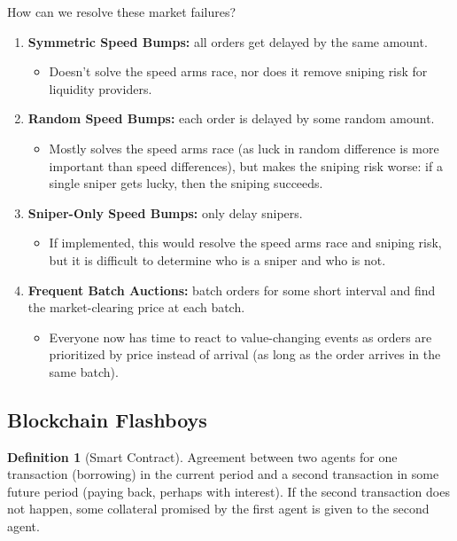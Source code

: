 \documentclass[dvipsnames]{article}
\theoremstyle{definition}
\newtheorem{definition}{Definition}[section]
\theoremstyle{remark}
\begin{document}
How can we resolve these market failures? 

\begin{enumerate}
	\item \textbf{Symmetric Speed Bumps:} all orders get delayed by the same amount. 
	\begin{itemize}
		\item Doesn't solve the speed arms race, nor does it remove sniping risk for liquidity providers.
	\end{itemize}
	\item \textbf{Random Speed Bumps:} each order is delayed by some random amount.
	\begin{itemize}
		\item Mostly solves the speed arms race (as luck in random difference is more important than speed differences), but makes the sniping risk worse: if a single sniper gets lucky, then the sniping succeeds.
	\end{itemize}
	\item \textbf{Sniper-Only Speed Bumps:} only delay snipers.
	\begin{itemize}
		\item If implemented, this would resolve the speed arms race and sniping risk, but it is difficult to determine who is a sniper and who is not.
	\end{itemize}
	\item \textbf{Frequent Batch Auctions:} batch orders for some short interval and find the market-clearing price at each batch.
	\begin{itemize}
		\item Everyone now has time to react to value-changing events as orders are prioritized by price instead of arrival (as long as the order arrives in the same batch).
	\end{itemize}
\end{enumerate}

\subsection{Blockchain Flashboys}

\begin{definition}[Smart Contract]
	Agreement between two agents for one transaction (borrowing) in the current period and a second transaction in some future period (paying back, perhaps with interest). If the second transaction does not happen, some collateral promised by the first agent is given to the second agent.
\end{definition}
\end{document}
